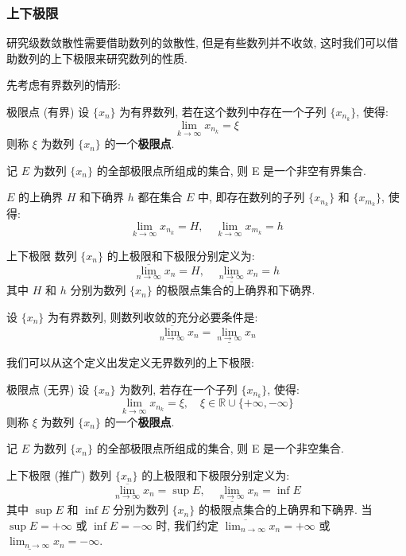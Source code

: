 \documentclass[a4paper,12pt]{ctexart}
\begin{document}
\subsubsection{上下极限}

研究级数敛散性需要借助数列的敛散性, 但是有些数列并不收敛, 这时我们可以借助数列的上下极限来研究数列的性质.

先考虑有界数列的情形:

\begin{mydef}{极限点 (有界)}{}
设 $\{x_n\}$ 为有界数列, 若在这个数列中存在一个子列 $\{x_{n_k}\}$, 使得:
$$
\lim_{k \to \infty} x_{n_k} = \xi
$$
则称 $\xi$ 为数列 $\{x_n\}$ 的一个\textbf{极限点}.
\end{mydef}
记 $E$ 为数列 $\{x_n\}$ 的全部极限点所组成的集合, 则 E 是一个非空有界集合.

\begin{mythm}{}{}
$E$ 的上确界 $H$ 和下确界 $h$ 都在集合 $E$ 中, 即存在数列的子列 $\{x_{n_k}\}$ 和 $\{x_{m_k}\}$, 使得:
$$\lim_{k \to \infty} x_{n_k} = H, \quad \lim_{k \to \infty} x_{m_k} = h$$
\end{mythm}

\begin{mydef}{上下极限}{}
数列 $\{x_n\}$ 的上极限和下极限分别定义为:
$$
\overline{\lim_{n \to \infty}} x_n = H, \quad \underline{\lim_{n \to \infty}} x_n = h
$$
其中 $H$ 和 $h$ 分别为数列 $\{x_n\}$ 的极限点集合的上确界和下确界.
\end{mydef}

\begin{mythm}{}{}
设 $\{x_n\}$ 为有界数列, 则数列收敛的充分必要条件是:
$$
\overline{\lim_{n \to \infty}} x_n = \underline{\lim_{n \to \infty}} x_n
$$
\end{mythm}

我们可以从这个定义出发定义无界数列的上下极限:

\begin{mydef}{极限点 (无界)}{}
设 $\{x_n\}$ 为数列, 若存在一个子列 $\{x_{n_k}\}$, 使得:
$$
\lim_{k \to \infty} x_{n_k} = \xi, \quad \xi \in \mathbb{R} \cup \{+\infty, -\infty\}
$$
则称 $\xi$ 为数列 $\{x_n\}$ 的一个\textbf{极限点}.
\end{mydef}
记 $E$ 为数列 $\{x_n\}$ 的全部极限点所组成的集合, 则 E 是一个非空集合.

\begin{mydef}{上下极限 (推广)}{}
数列 $\{x_n\}$ 的上极限和下极限分别定义为:
$$
\overline{\lim_{n \to \infty}} x_n = \sup E, \quad \underline{\lim_{n \to \infty}} x_n = \inf E
$$
其中 $\sup E$ 和 $\inf E$ 分别为数列 $\{x_n\}$ 的极限点集合的上确界和下确界. 当 $\sup E = +\infty$ 或 $\inf E = -\infty$ 时, 我们约定 $\overline{\lim_{n \to \infty}} x_n = +\infty$ 或 $\underline{\lim_{n \to \infty}} x_n = -\infty$.
\end{mydef}
\end{document}
